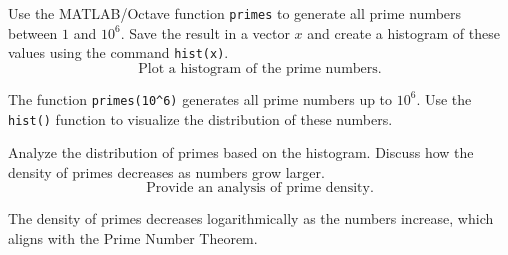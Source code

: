 \documentclass{ximera}
\author{Jont Allen}
\begin{document}
\begin{problem}
    Use the MATLAB/Octave function \texttt{primes} to generate all prime numbers between \(1\) and \(10^6\).
    Save the result in a vector \(x\) and create a histogram of these values using the command \texttt{hist(x)}.
    \[
    \text{Plot a histogram of the prime numbers.}
    \]
    \begin{feedback}[correct]
    The function \texttt{primes(10^6)} generates all prime numbers up to \(10^6\). Use the \texttt{hist()} function to visualize the distribution of these numbers.
    \end{feedback}
\end{problem}

\begin{problem}
    Analyze the distribution of primes based on the histogram.
    Discuss how the density of primes decreases as numbers grow larger.
    \[
    \text{Provide an analysis of prime density.}
    \]
    \begin{feedback}[correct]
    The density of primes decreases logarithmically as the numbers increase, which aligns with the Prime Number Theorem.
    \end{feedback}
\end{problem}
\end{document}
